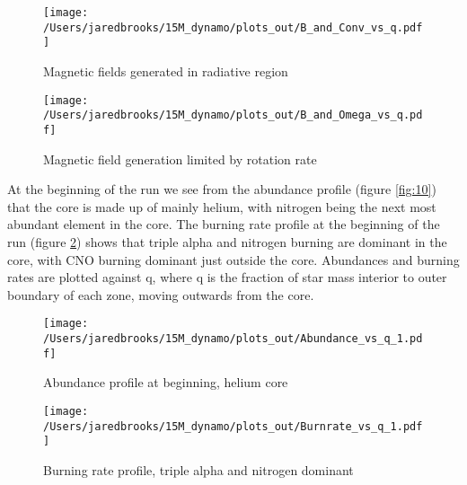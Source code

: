 \documentclass{article}
\begin{document}
        \begin{figure}[H]
                \begin{minipage}[b]{0.5\linewidth}
                       \centering
                       \texttt{[image: /Users/jaredbrooks/15M\_dynamo/plots\_out/B\_and\_Conv\_vs\_q.pdf]}
                       \caption{Magnetic fields generated in radiative region}
                       \label{fig:5}
                \end{minipage}
                \hspace{0cm}
                \begin{minipage}[b]{0.5\linewidth}
                       \centering
                       \texttt{[image: /Users/jaredbrooks/15M\_dynamo/plots\_out/B\_and\_Omega\_vs\_q.pdf]}
                       \caption{Magnetic field generation limited by rotation rate}
                       \label{fig:6}
                \end{minipage}
        \end{figure}

        \pagebreak

        At the beginning of the run we see from the abundance profile (figure \ref{fig:10}) that the core is made up of mainly helium, with nitrogen being the next most abundant element in the core.  The burning rate profile at the beginning of the run (figure \ref{fig:11}) shows that triple alpha and nitrogen burning are dominant in the core, with CNO burning dominant just outside the core.  Abundances and burning rates are plotted against q, where q is the fraction of star mass interior to outer boundary of each zone, moving outwards from the core.

        \begin{figure}[H]
                \begin{minipage}[b]{0.5\linewidth}
                       \centering
                       \texttt{[image: /Users/jaredbrooks/15M\_dynamo/plots\_out/Abundance\_vs\_q\_1.pdf]}
                       \caption{Abundance profile at beginning, helium core}
                       \label{fig:10}
                \end{minipage}
                \hspace{0cm}
                \begin{minipage}[b]{0.5\linewidth}
                       \centering
                       \texttt{[image: /Users/jaredbrooks/15M\_dynamo/plots\_out/Burnrate\_vs\_q\_1.pdf]}
                       \caption{Burning rate profile, triple alpha and nitrogen dominant}
                       \label{fig:11}
                \end{minipage}
        \end{figure}
\end{document}

